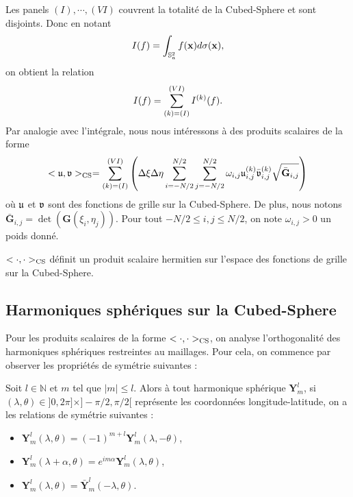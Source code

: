 Les panels $(I), \cdots, (VI)$ couvrent la totalité de la Cubed-Sphere et sont disjoints. Donc en notant
\begin{equation}
I(f) = \displaystyle\int_{\mathbb{S}_a^2}f(\mathbf{x}) d \sigma(\mathbf{x}),
\end{equation}
on obtient la relation
\begin{equation}
I(f) = \displaystyle\sum\limits_{(k)=(I)}^{(VI)} I^{(k)}(f).
\end{equation}
Par analogie avec l'intégrale, nous nous intéressons à des produits scalaires de la forme
\begin{equation}
<\mathfrak{u}, \mathfrak{v}>_{\text{CS}} = \displaystyle\sum\limits_{(k)=(I)}^{(VI)} \left( \Delta \xi \Delta \eta \displaystyle\sum\limits_{i=-N/2}^{N/2} \displaystyle\sum\limits_{j=-N/2}^{N/2} \omega_{i,j} \mathfrak{u}_{i,j}^{(k)} \bar{\mathfrak{v}}_{i,j}^{(k)} \sqrt{\bar{\mathbf{G}}_{i,j}} \right)
\end{equation}
où $\mathfrak{u}$ et $\mathfrak{v}$ sont des fonctions de grille sur la Cubed-Sphere. De plus, nous notons $\bar{\mathbf{G}}_{i,j} = \det (\mathbf{G}(\xi_i, \eta_j))$. Pour tout $-N/2 \leq i,j \leq N/2$, on note $\omega_{i,j}>0$ un poids donné.

\begin{proposition}
$<\cdot, \cdot>_{\text{CS}}$ définit un produit scalaire hermitien sur l'espace des fonctions de grille sur la Cubed-Sphere.
\end{proposition}















\subsection{Harmoniques sphériques sur la Cubed-Sphere}

Pour les produits scalaires de la forme $<\cdot, \cdot>_{\text{CS}}$, on analyse l'orthogonalité des harmoniques sphériques restreintes au maillages. Pour cela, on commence par observer les propriétés de symétrie suivantes :

\begin{lemme}
Soit $l \in \mathbb{N}$ et $m$ tel que $|m| \leq l$. Alors à tout harmonique sphérique $\mathbf{Y}_m^l$, si $(\lambda, \theta) \in ]0,2 \pi] \times ]-\pi/2, \pi/2[$ représente les coordonnées longitude-latitude, on a les relations de symétrie suivantes :
\begin{itemize}
\item $\mathbf{Y}^l_m (\lambda, \theta) = (-1)^{m+l} \mathbf{Y}^l_m (\lambda, -\theta)$,
\item $\mathbf{Y}^l_m (\lambda + \alpha, \theta) = e^{i m \alpha} \mathbf{Y}^l_m \left(\lambda, \theta \right)$,
\item $\mathbf{Y}^l_m (\lambda, \theta) = \bar{\mathbf{Y}}^l_m (-\lambda, \theta)$.
\end{itemize}
\label{lem:HS_sym}
\end{lemme}

